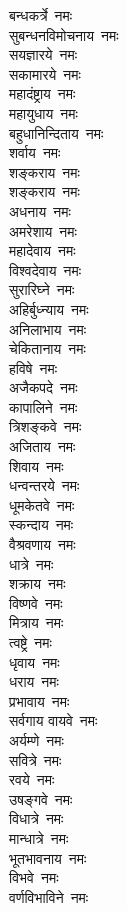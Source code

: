\begin{multicols}{2}
\begin{flushleft}
बन्धकर्त्रे~नमः\\
सुबन्धनविमोचनाय~नमः\\
सयज्ञारये~नमः\\
सकामारये~नमः\\
महादंष्ट्राय~नमः\\
महायुधाय~नमः\\
बहुधानिन्दिताय~नमः\\
शर्वाय~नमः\\
शङ्कराय~नमः\\
शङ्कराय~नमः\hfill{}\\
अधनाय~नमः\\
अमरेशाय~नमः\\
महादेवाय~नमः\\
विश्वदेवाय~नमः\\
सुरारिघ्ने~नमः\\
अहिर्बुध्न्याय~नमः\\
अनिलाभाय~नमः\\
चेकितानाय~नमः\\
हविषे~नमः\\
अजैकपदे~नमः\hfill{}\\
कापालिने~नमः\\
त्रिशङ्कवे~नमः\\
अजिताय~नमः\\
शिवाय~नमः\\
धन्वन्तरये~नमः\\
धूमकेतवे~नमः\\
स्कन्दाय~नमः\\
वैश्रवणाय~नमः\\
धात्रे~नमः\\
शक्राय~नमः\hfill{}\\
विष्णवे~नमः\\
मित्राय~नमः\\
त्वष्ट्रे~नमः\\
धृवाय~नमः\\
धराय~नमः\\
प्रभावाय~नमः\\
सर्वगाय वायवे~नमः\\
अर्यम्णे~नमः\\
सवित्रे~नमः\\
रवये~नमः\hfill{}\\
उषङ्गवे~नमः\\
विधात्रे~नमः\\
मान्धात्रे~नमः\\
भूतभावनाय~नमः\\
विभवे~नमः\\
वर्णविभाविने~नमः\\

\end{flushleft}
\end{multicols}
